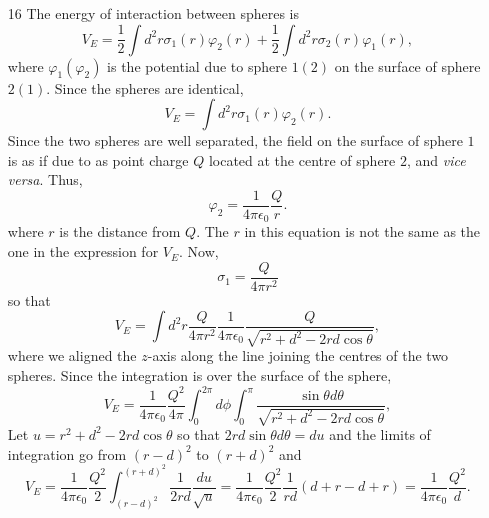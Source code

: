 \documentclass{article}
\newcommand{\ke}{\frac{1}{4\pi\epsilon_0}}
\begin{document}
\begin{enumerate}
\item[16] The energy of interaction between spheres is
\[
V_E = \frac{1}{2}\int d^2r \sigma_1(r)\varphi_2(r) + \frac{1}{2}\int d^2r \sigma_2(r)\varphi_1(r),
\]
where $\varphi_1(\varphi_2)$ is the potential due to sphere $1(2)$ on the surface
of sphere $2(1)$. Since the spheres are identical,
\[
V_E = \int d^2r \sigma_1(r)\varphi_2(r).
\]
Since the two spheres are well separated, the field on the surface of sphere $1$
is as if due to as point charge $Q$ located at the centre of sphere $2$, and 
\emph{vice versa}. Thus,
\[
\varphi_2 = \ke\frac{Q}{r}.
\]
where $r$ is the distance from $Q$. The $r$ in this equation is not the same as the
one in the expression for $V_E$. Now,
\[
\sigma_1 = \frac{Q}{4\pi r^2}
\]
so that
\[
V_E = \int d^2 r \frac{Q}{4\pi r^2} \ke \frac{Q}{\sqrt{r^2 + d^2 - 2rd\cos\theta}},
\]
where we aligned the $z$-axis along the line joining the centres of the two spheres.
Since the integration is over the surface of the sphere,
\[
V_E = \ke\frac{Q^2}{4\pi}\int_0^{2\pi}d\phi \int_0^\pi \frac{\sin\theta d\theta}{\sqrt{r^2 + d^2 - 2rd\cos\theta}},
\]
Let $u = r^2 + d^2 - 2rd\cos\theta$ so that $2rd\sin\theta d\theta = du$ and the 
limits of integration go from $(r - d)^2$ to $(r + d)^2$ and
\[
V_E = \ke \frac{Q^2}{2}\int_{(r - d)^2}^{(r + d)^2}\frac{1}{2rd}\frac{du}{\sqrt{u}} 
= \ke\frac{Q^2}{2}\frac{1}{rd}(d + r - d + r) = \ke\frac{Q^2}{d}.
\]
\end{enumerate}
\end{document}
